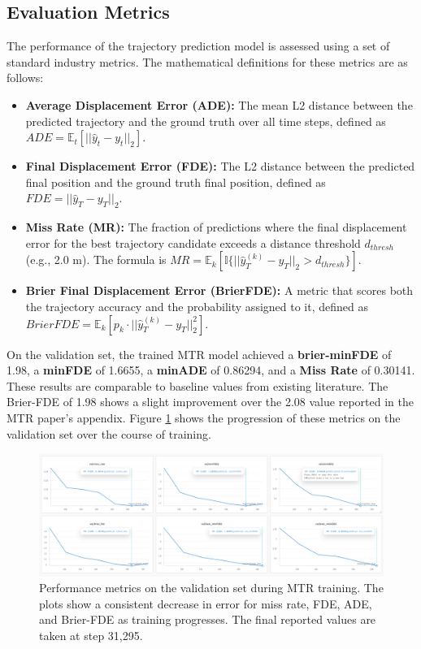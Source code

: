 \subsection{Evaluation Metrics}
\label{sec:exp_metrics}
The performance of the trajectory prediction model is assessed using a set of standard industry metrics. The mathematical definitions for these metrics are as follows:
\begin{itemize}
 \item \textbf{Average Displacement Error (ADE):} The mean L2 distance between the predicted trajectory and the ground truth over all time steps, defined as $ADE=\mathbb{E}_{t}[||\hat{y}_{t}-y_{t}||_{2}]$.
 \item \textbf{Final Displacement Error (FDE):} The L2 distance between the predicted final position and the ground truth final position, defined as $FDE=||\hat{y}_{T}-y_{T}||_{2}$.
 \item \textbf{Miss Rate (MR):} The fraction of predictions where the final displacement error for the best trajectory candidate exceeds a distance threshold $d_{thresh}$ (e.g., 2.0 m). The formula is $MR=\mathbb{E}_{k}[\mathbb{I}\{||\hat{y}_{T}^{(k)}-y_{T}||_{2}>d_{thresh}\}]$.
 \item \textbf{Brier Final Displacement Error (BrierFDE):} A metric that scores both the trajectory accuracy and the probability assigned to it, defined as $BrierFDE=\mathbb{E}_{k}[p_{k}\cdot||\hat{y}_{T}^{(k)}-y_{T}||_{2}^{2}]$.
\end{itemize}
On the validation set, the trained MTR model achieved a \textbf{brier-minFDE} of 1.98, a \textbf{minFDE} of 1.6655, a \textbf{minADE} of 0.86294, and a \textbf{Miss Rate} of 0.30141. These results are comparable to baseline values from existing literature. The Brier-FDE of 1.98 shows a slight improvement over the 2.08 value reported in the MTR paper's appendix. Figure \ref{fig:validation_metrics} shows the progression of these metrics on the validation set over the course of training.

\begin{figure}[htbp]
    \centering
    \includegraphics[width=\textwidth]{figures/performance_metrics_validation.png}
    \caption{Performance metrics on the validation set during MTR training. The plots show a consistent decrease in error for miss rate, FDE, ADE, and Brier-FDE as training progresses. The final reported values are taken at step 31,295.}
    \label{fig:validation_metrics}
\end{figure}

